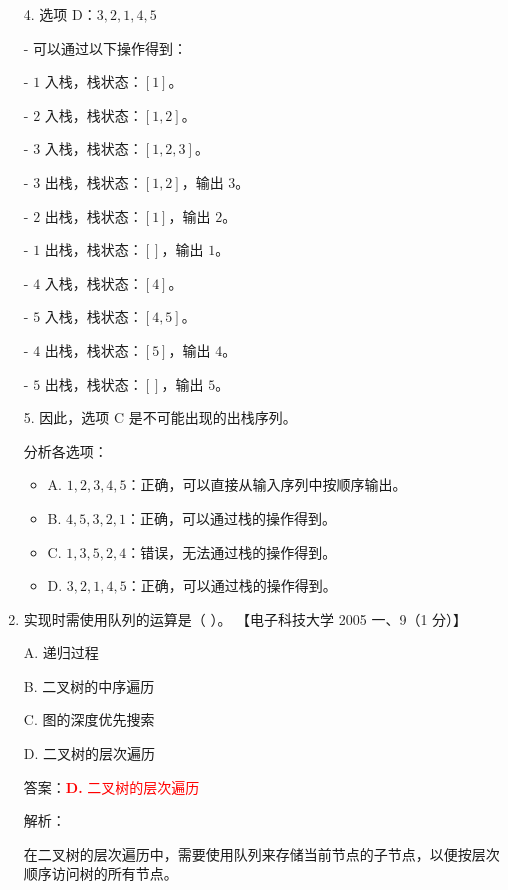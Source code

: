 \documentclass[lang=cn,newtx,10pt,scheme=chinese]{../../../elegantbook}
\begin{document}
\begin{enumerate}
    4. 选项 D：$3,2,1,4,5$

         - 可以通过以下操作得到：
    
            - $1$ 入栈，栈状态：$[1]$。
    
            - $2$ 入栈，栈状态：$[1, 2]$。
    
            - $3$ 入栈，栈状态：$[1, 2, 3]$。
    
            - $3$ 出栈，栈状态：$[1, 2]$，输出 $3$。
    
            - $2$ 出栈，栈状态：$[1]$，输出 $2$。
    
            - $1$ 出栈，栈状态：$[]$，输出 $1$。
    
            - $4$ 入栈，栈状态：$[4]$。
    
            - $5$ 入栈，栈状态：$[4, 5]$。
    
            - $4$ 出栈，栈状态：$[5]$，输出 $4$。
    
            - $5$ 出栈，栈状态：$[]$，输出 $5$。

    5. 因此，选项 C 是不可能出现的出栈序列。

    分析各选项：
    \begin{itemize}
        \item A. $1,2,3,4,5$：正确，可以直接从输入序列中按顺序输出。
        
        \item B. $4,5,3,2,1$：正确，可以通过栈的操作得到。
        
        \item C. $1,3,5,2,4$：错误，无法通过栈的操作得到。
        
        \item D. $3,2,1,4,5$：正确，可以通过栈的操作得到。
    \end{itemize}
            




    \item 实现时需使用队列的运算是（ ）。  
    【电子科技大学 2005 一、9（1 分）】  

    A. 递归过程  

    B. 二叉树的中序遍历  

    C. 图的深度优先搜索 

    D. 二叉树的层次遍历  

    答案：\textcolor{red}{\textbf{D.} 二叉树的层次遍历}

    解析：

    在二叉树的层次遍历中，需要使用队列来存储当前节点的子节点，以便按层次顺序访问树的所有节点。


\end{enumerate}
\end{document}
